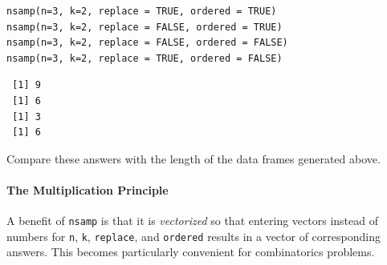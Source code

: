 \documentclass[captions=tableheading]{scrbook}
\begin{document}
\begin{verbatim}
nsamp(n=3, k=2, replace = TRUE, ordered = TRUE) 
nsamp(n=3, k=2, replace = FALSE, ordered = TRUE) 
nsamp(n=3, k=2, replace = FALSE, ordered = FALSE) 
nsamp(n=3, k=2, replace = TRUE, ordered = FALSE)
\end{verbatim}

\begin{verbatim}
 [1] 9
 [1] 6
 [1] 3
 [1] 6
\end{verbatim}

Compare these answers with the length of the data frames generated above.


\paragraph*{The Multiplication Principle}

A benefit of \texttt{nsamp} is that it is \emph{vectorized} so that entering vectors instead of numbers for \texttt{n}, \texttt{k}, \texttt{replace}, and \texttt{ordered} results in a vector of corresponding answers. This becomes particularly convenient for combinatorics problems.
\end{document}
